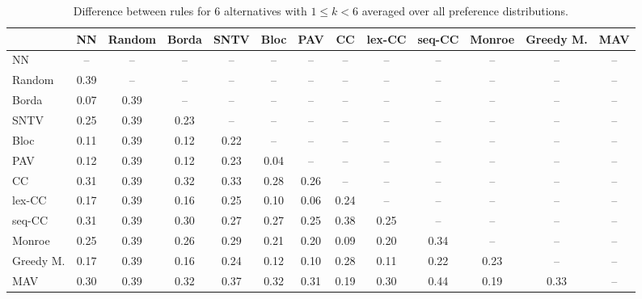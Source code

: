 
\begin{table*}[htbp]
\centering
\begin{tabular}{lcccccccccccc}
\toprule
 & NN & Random & Borda & SNTV & Bloc & PAV & CC & lex-CC & seq-CC & Monroe & Greedy M. & MAV \\
\midrule
NN & -- & -- & -- & -- & -- & -- & -- & -- & -- & -- & -- & -- \\
Random & \cellcolor{blue!39} 0.39 & -- & -- & -- & -- & -- & -- & -- & -- & -- & -- & -- \\
Borda & \cellcolor{blue!7} 0.07 & \cellcolor{blue!39} 0.39 & -- & -- & -- & -- & -- & -- & -- & -- & -- & -- \\
SNTV & \cellcolor{blue!25} 0.25 & \cellcolor{blue!39} 0.39 & \cellcolor{blue!23} 0.23 & -- & -- & -- & -- & -- & -- & -- & -- & -- \\
Bloc & \cellcolor{blue!11} 0.11 & \cellcolor{blue!39} 0.39 & \cellcolor{blue!12} 0.12 & \cellcolor{blue!22} 0.22 & -- & -- & -- & -- & -- & -- & -- & -- \\
PAV & \cellcolor{blue!12} 0.12 & \cellcolor{blue!39} 0.39 & \cellcolor{blue!12} 0.12 & \cellcolor{blue!23} 0.23 & \cellcolor{blue!4} 0.04 & -- & -- & -- & -- & -- & -- & -- \\
CC & \cellcolor{blue!31} 0.31 & \cellcolor{blue!39} 0.39 & \cellcolor{blue!32} 0.32 & \cellcolor{blue!33} 0.33 & \cellcolor{blue!28} 0.28 & \cellcolor{blue!26} 0.26 & -- & -- & -- & -- & -- & -- \\
lex-CC & \cellcolor{blue!17} 0.17 & \cellcolor{blue!39} 0.39 & \cellcolor{blue!16} 0.16 & \cellcolor{blue!25} 0.25 & \cellcolor{blue!10} 0.10 & \cellcolor{blue!6} 0.06 & \cellcolor{blue!24} 0.24 & -- & -- & -- & -- & -- \\
seq-CC & \cellcolor{blue!31} 0.31 & \cellcolor{blue!39} 0.39 & \cellcolor{blue!30} 0.30 & \cellcolor{blue!27} 0.27 & \cellcolor{blue!27} 0.27 & \cellcolor{blue!25} 0.25 & \cellcolor{blue!38} 0.38 & \cellcolor{blue!25} 0.25 & -- & -- & -- & -- \\
Monroe & \cellcolor{blue!25} 0.25 & \cellcolor{blue!39} 0.39 & \cellcolor{blue!26} 0.26 & \cellcolor{blue!28} 0.29 & \cellcolor{blue!21} 0.21 & \cellcolor{blue!20} 0.20 & \cellcolor{blue!9} 0.09 & \cellcolor{blue!20} 0.20 & \cellcolor{blue!34} 0.34 & -- & -- & -- \\
Greedy M. & \cellcolor{blue!17} 0.17 & \cellcolor{blue!39} 0.39 & \cellcolor{blue!16} 0.16 & \cellcolor{blue!24} 0.24 & \cellcolor{blue!12} 0.12 & \cellcolor{blue!10} 0.10 & \cellcolor{blue!28} 0.28 & \cellcolor{blue!11} 0.11 & \cellcolor{blue!22} 0.22 & \cellcolor{blue!23} 0.23 & -- & -- \\
MAV & \cellcolor{blue!30} 0.30 & \cellcolor{blue!39} 0.39 & \cellcolor{blue!32} 0.32 & \cellcolor{blue!37} 0.37 & \cellcolor{blue!32} 0.32 & \cellcolor{blue!31} 0.31 & \cellcolor{blue!19} 0.19 & \cellcolor{blue!30} 0.30 & \cellcolor{blue!44} 0.44 & \cellcolor{blue!19} 0.19 & \cellcolor{blue!33} 0.33 & -- \\
\bottomrule
\end{tabular}

\caption{Difference between rules for 6 alternatives with $1 \leq k < 6$ averaged over all preference distributions.}
\label{tab:rule_distance_heatmap-m=[6]-pref_dist=all}
\end{table*}
    